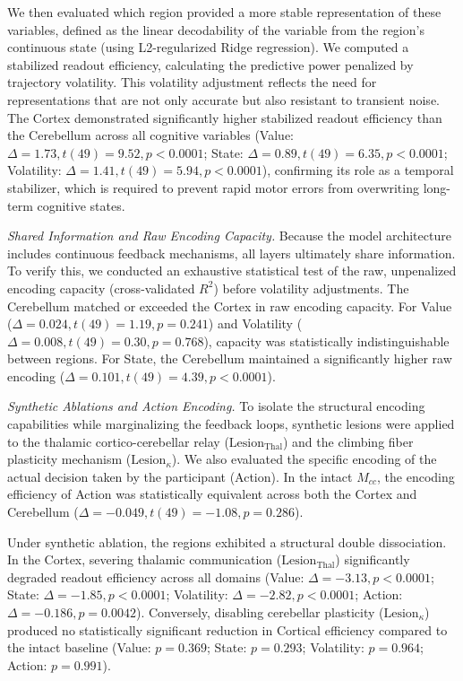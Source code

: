 \documentclass[12pt, a4paper]{extarticle}
\begin{document}
We then evaluated which region provided a more stable representation of these variables, defined as the linear decodability of the variable from the region's continuous state (using L2-regularized Ridge regression). We computed a stabilized readout efficiency, calculating the predictive power penalized by trajectory volatility. This volatility adjustment reflects the need for representations that are not only accurate but also resistant to transient noise. The Cortex demonstrated significantly higher stabilized readout efficiency than the Cerebellum across all cognitive variables (Value: $\Delta = 1.73, t(49) = 9.52, p < 0.0001$; State: $\Delta = 0.89, t(49) = 6.35, p < 0.0001$; Volatility: $\Delta = 1.41, t(49) = 5.94, p < 0.0001$), confirming its role as a temporal stabilizer, which is required to prevent rapid motor errors from overwriting long-term cognitive states.

\textit{Shared Information and Raw Encoding Capacity.} Because the model architecture includes continuous feedback mechanisms, all layers ultimately share information. To verify this, we conducted an exhaustive statistical test of the raw, unpenalized encoding capacity (cross-validated $R^2$) before volatility adjustments. The Cerebellum matched or exceeded the Cortex in raw encoding capacity. For Value ($\Delta = 0.024, t(49) = 1.19, p = 0.241$) and Volatility ($\Delta = 0.008, t(49) = 0.30, p = 0.768$), capacity was statistically indistinguishable between regions. For State, the Cerebellum maintained a significantly higher raw encoding ($\Delta = 0.101, t(49) = 4.39, p < 0.0001$). 

\textit{Synthetic Ablations and Action Encoding.} To isolate the structural encoding capabilities while marginalizing the feedback loops, synthetic lesions were applied to the thalamic cortico-cerebellar relay ($\text{Lesion}_{\text{Thal}}$) and the climbing fiber plasticity mechanism ($\text{Lesion}_{\kappa}$). We also evaluated the specific encoding of the actual decision taken by the participant (Action). In the intact $M_{cc}$, the encoding efficiency of Action was statistically equivalent across both the Cortex and Cerebellum ($\Delta = -0.049, t(49) = -1.08, p = 0.286$).

Under synthetic ablation, the regions exhibited a structural double dissociation. In the Cortex, severing thalamic communication ($\text{Lesion}_{\text{Thal}}$) significantly degraded readout efficiency across all domains (Value: $\Delta = -3.13, p < 0.0001$; State: $\Delta = -1.85, p < 0.0001$; Volatility: $\Delta = -2.82, p < 0.0001$; Action: $\Delta = -0.186, p = 0.0042$). Conversely, disabling cerebellar plasticity ($\text{Lesion}_{\kappa}$) produced no statistically significant reduction in Cortical efficiency compared to the intact baseline (Value: $p = 0.369$; State: $p = 0.293$; Volatility: $p = 0.964$; Action: $p = 0.991$).
\end{document}
